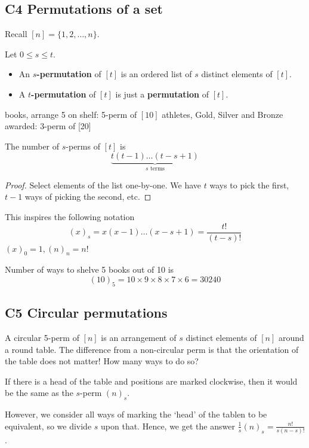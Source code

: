 \documentclass[12pt]{article}
\begin{document}
\subsection{C4 Permutations of a set}
\rmk Recall $[n]=\{1,2,\dots,n\}$.

 Let $0\leq s\leq t$. \begin{itemize}
    \item An \textbf{$s$-permutation} of $[t]$ is an ordered list of $s$ distinct elements of $[t]$.
    \item A \textbf{$t$-permutation} of $[t]$ is just a \textbf{permutation} of $[t]$.
\end{itemize}

 books, arrange 5 on shelf: 5-perm of $[10]$
 athletes, Gold, Silver and Bronze awarded: 3-perm of [20]

\begin{theorem}
    The number of $s$-perms of $[t]$ is \[\underset{s\text{ terms}}{\underbrace{t(t-1)\dots (t-s+1)}}\]
\end{theorem}
\begin{proof}
    Select elements of the list one-by-one. We have $t$ ways to pick the first, $t-1$ ways of picking the second, etc.
\end{proof}

 This inspires the following notation \[(x)_s=x(x-1)\dots(x-s+1)=\frac{t!}{(t-s)!}\]
\rmk $(x)_0=1, (n)_n=n!$

\eg Number of ways to shelve 5 books out of 10 is $$(10)_5=10\times9\times8\times7\times6=30240$$

\subsection{C5 Circular permutations}

A circular 5-perm of $[n]$ is an arrangement of $s$ distinct elements of $[n]$ around a round table. The difference from a non-circular perm is that the orientation of the table does not matter! How many ways to do so?

If there is a head of the table and positions are marked clockwise, then it would be the same as the $s$-perm $(n)_s$.

However, we consider all ways of marking the `head' of the tablen to be equivalent, so we divide $s$ upon that. Hence, we get the answer $\displaystyle\frac{1}{s}(n)_s=\frac{n!}{s(n-s)!}$.
\end{document}
